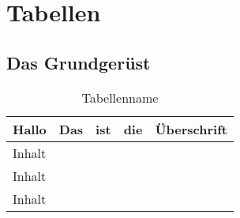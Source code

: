 \section{Tabellen}
\subsection{Das Grundgerüst}
\begin{table}[h]
\begin{tabular}{l|l|l|l|l}
Hallo  & Das & ist & die & Überschrift \\ \hline
Inhalt &     &     &     &             \\
Inhalt &     &     &     &             \\
Inhalt &     &     &     &            
\end{tabular}
\caption{Tabellenname}
\end{table}

